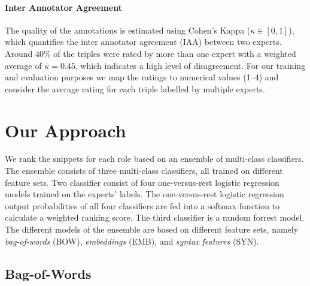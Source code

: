 {\setlength{\parindent}{0cm}
\paragraph{\textbf{Inter Annotator Agreement}}
The quality of the annotations is estimated using Cohen's Kappa ($\kappa\in [0,1]$), which quantifies the inter annotator agreement (IAA) between two experts.%
Around 40\% of the triples were rated by more than one expert with a weighted average of $\overline{\kappa}=0.45$, which indicates a high level of disagreement.
For our training and evaluation purposes we map the ratings to numerical values (1--4) and consider the average rating for each triple labelled by multiple experts.
}


\section{Our Approach}
We rank the snippets for each role based on an ensemble of multi-class classifiers.
The ensemble consists of three multi-class classifiers, all trained on different feature sets.
Two classifier consist of four one-versus-rest logistic regression models trained on the experts' labels.
The one-versus-rest logistic regression output probabilities of all four classifiers are fed into a softmax function to calculate a weighted ranking score.
The third classifier is a random forrest model.
The different models of the ensemble are based on different feature sets, namely \emph{bag-of-words} (BOW), \emph{embeddings} (EMB), and \emph{syntax features} (SYN).


\subsection{Bag-of-Words}

